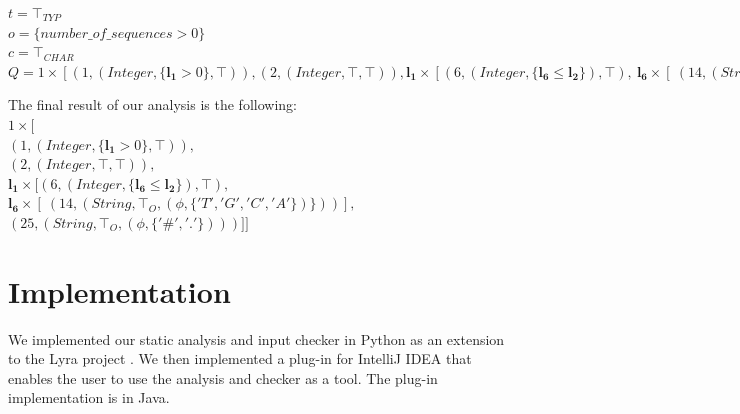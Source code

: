 \documentclass[10pt]{report}
\begin{document}
\begin{enumerate}
	\begin{center}
		$ t = \top_{TYP} $ \\
		$ o = \lbrace number\_of\_sequences > 0 \rbrace $\\
		$ c = \top_{CHAR} $ \\
		$ Q = 1 \times [ (1, (Integer, \lbrace \mathbf{l_{1}} > 0 \rbrace, \top)) ,(2, (Integer, \top, \top)), \mathbf{l_{1}} \times [(6, (Integer, \lbrace \mathbf{l_{6}} \leq \mathbf{l_{2}} \rbrace ), \top), \ \mathbf{l_{6}} \times [\ (14, (String, \top_{O}, (\phi, \lbrace'T', 'G', 'C', 'A' \rbrace) \rbrace))], (25, (String, \top_{O}, (\phi, \lbrace '\#', '.' \rbrace)))]] $
	\end{center}
	
	The final result of our analysis is the following:\\
	$ 1 \times [ $ \\
	$ (1, (Integer, \lbrace \mathbf{l_{1}} > 0 \rbrace, \top)), $ \\
	$(2, (Integer, \top, \top)), $ \\
	$ \mathbf{l_{1}} \times [(6, (Integer, \lbrace \mathbf{l_{6}} \leq \mathbf{l_{2}} \rbrace ), \top), $ \\
	\hspace*{0.5cm} $ \mathbf{l_{6}} \times [\ (14, (String, \top_{O}, (\phi, \lbrace'T', 'G', 'C', 'A' \rbrace) \rbrace))], $ \\
	\hspace*{1cm} $ (25, (String, \top_{O}, (\phi, \lbrace '\#', '.' \rbrace)))]] $
	
\end{enumerate}



\chapter{Implementation} \label{implementation}

We implemented our static analysis and input checker in Python as an extension to the Lyra project \cite{lyra}. We then implemented a plug-in for IntelliJ IDEA that enables the user to use the analysis and checker as a tool. The plug-in implementation is in Java. 
\end{document}
